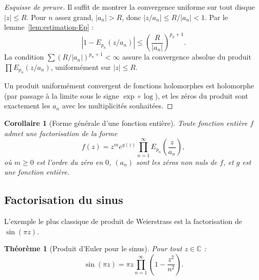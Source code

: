 \documentclass[12pt,a4paper,openany]{book}
\theoremstyle{definition}
\theoremstyle{plain}
\newtheorem{theoreme}[definition]{Théorème}
\newtheorem{corollaire}[definition]{Corollaire}
\theoremstyle{remark}
\newcommand{\C}{\mathbb{C}}
\newcommand{\abs}[1]{\left|#1\right|}
\begin{document}
\begin{proof}[Esquisse de preuve]
Il suffit de montrer la convergence uniforme sur tout disque $\abs{z} \leq R$.
Pour $n$ assez grand, $\abs{a_n} > R$, donc $\abs{z/a_n} \leq R/\abs{a_n} < 1$.
Par le lemme~\ref{lem:estimation-Ep} :
\[
  \abs{1 - E_{p_n}(z/a_n)} \leq \left(\frac{R}{\abs{a_n}}\right)^{p_n+1}.
\]
La condition $\sum (R/\abs{a_n})^{p_n+1} < \infty$ assure la convergence
absolue du produit $\prod E_{p_n}(z/a_n)$, uniformément sur $\abs{z} \leq R$.

Un produit uniformément convergent de fonctions holomorphes est holomorphe
(par passage à la limite sous le signe $\exp\circ\log$), et les zéros du
produit sont exactement les $a_n$ avec les multiplicités souhaitées.
\end{proof}

\begin{corollaire}[Forme générale d'une fonction entière]\label{cor:hadamard-forme}
Toute fonction entière $f$ admet une factorisation de la forme
\[
  f(z) = z^m e^{g(z)} \prod_{n=1}^{\infty} E_{p_n}\!\left(\frac{z}{a_n}\right),
\]
où $m \geq 0$ est l'ordre du zéro en $0$, $(a_n)$ sont les zéros non nuls
de $f$, et $g$ est une fonction entière.
\end{corollaire}

\subsection{Factorisation du sinus}

L'exemple le plus classique de produit de Weierstrass est la factorisation
de $\sin(\pi z)$.

\begin{theoreme}[Produit d'Euler pour le sinus]\label{thm:euler-sinus}
Pour tout $z \in \C$ :
\begin{equation}\label{eq:euler-sinus}
  \sin(\pi z) = \pi z \prod_{n=1}^{\infty}
  \left(1 - \frac{z^2}{n^2}\right).
\end{equation}
\end{theoreme}
\end{document}

